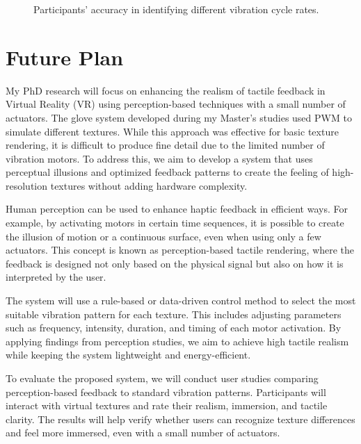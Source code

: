 \documentclass[graybox]{svmult}
\begin{document}
\begin{figure}\centering
	
	\caption{Participants' accuracy in identifying different vibration cycle rates.}\label{fig:questionnaire_results}
\end{figure}



\section{Future Plan}

My PhD research will focus on enhancing the realism of tactile feedback in Virtual Reality (VR) using perception-based techniques with a small number of actuators. The glove system developed during my Master’s studies used PWM to simulate different textures. While this approach was effective for basic texture rendering, it is difficult to produce fine detail due to the limited number of vibration motors. To address this, we aim to develop a system that uses perceptual illusions and optimized feedback patterns to create the feeling of high-resolution textures without adding hardware complexity.

Human perception can be used to enhance haptic feedback in efficient ways. For example, by activating motors in certain time sequences, it is possible to create the illusion of motion or a continuous surface, even when using only a few actuators. This concept is known as perception-based tactile rendering, where the feedback is designed not only based on the physical signal but also on how it is interpreted by the user.

The system will use a rule-based or data-driven control method to select the most suitable vibration pattern for each texture. This includes adjusting parameters such as frequency, intensity, duration, and timing of each motor activation. By applying findings from perception studies, we aim to achieve high tactile realism while keeping the system lightweight and energy-efficient.

To evaluate the proposed system, we will conduct user studies comparing perception-based feedback to standard vibration patterns. Participants will interact with virtual textures and rate their realism, immersion, and tactile clarity. The results will help verify whether users can recognize texture differences and feel more immersed, even with a small number of actuators.
\end{document}
